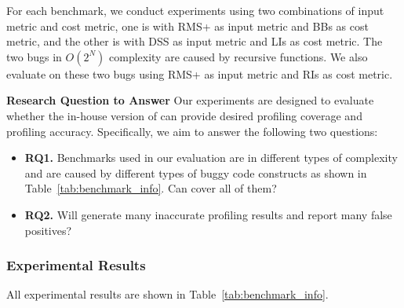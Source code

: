 For each benchmark, we conduct experiments using two 
combinations of input metric and cost metric, one is with 
RMS+ as input metric and BBs as cost metric, 
and the other is with DSS as input metric and LIs as cost metric. 
The two bugs in $O(2^N)$ complexity are caused by recursive functions.
We also evaluate \Tool on these two bugs 
using RMS+ as input metric and RIs as cost metric. 


\textbf{Research Question to Answer}
Our experiments are designed to evaluate whether the in-house version 
of \Tool can provide desired profiling coverage and profiling accuracy. 
Specifically, we aim to answer the following two questions:

\begin{itemize}

\item {\bf RQ1.} 
Benchmarks used in our evaluation are in different types of complexity and 
are caused by different types of buggy code constructs 
as shown in Table~\ref{tab:benchmark_info}. 
Can \Tool cover all of them? 
 
\item {\bf RQ2.}
Will \Tool generate many inaccurate profiling results and report many false positives? 

\end{itemize}

\subsubsection{Experimental Results}
All experimental results are shown in Table~\ref{tab:benchmark_info}.